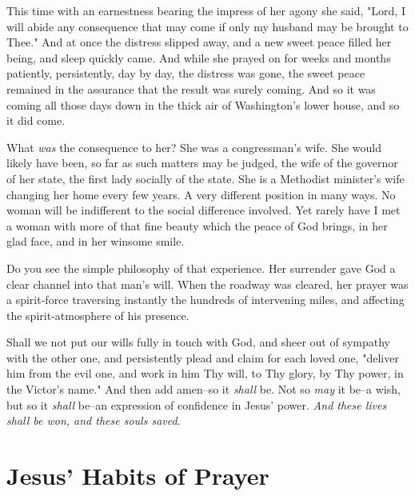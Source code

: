This time with an earnestness bearing the impress of her agony she said,
"Lord, I will abide any consequence that may come if only my husband may
be brought to Thee." And at once the distress slipped away, and a new
sweet peace filled her being, and sleep quickly came. And while she prayed
on for weeks and months patiently, persistently, day by day, the distress
was gone, the sweet peace remained in the assurance that the result was
surely coming. And so it was coming all those days down in the thick air
of Washington's lower house, and so it did come.

What \textit{was} the consequence to her? She was a congressman's wife. She would
likely have been, so far as such matters may be judged, the wife of the
governor of her state, the first lady socially of the state. She is a
Methodist minister's wife changing her home every few years. A very
different position in many ways. No woman will be indifferent to the
social difference involved. Yet rarely have I met a woman with more of
that fine beauty which the peace of God brings, in her glad face, and in
her winsome smile.

Do you see the simple philosophy of that experience. Her surrender gave
God a clear channel into that man's will. When the roadway was cleared,
her prayer was a spirit-force traversing instantly the hundreds of
intervening miles, and affecting the spirit-atmosphere of his presence.

Shall we not put our wills fully in touch with God, and sheer out of
sympathy with the other one, and persistently plead and claim for each
loved one, "deliver him from the evil one, and work in him Thy will, to
Thy glory, by Thy power, in the Victor's name." And then add amen--so it
\textit{shall} be. Not so \textit{may} it be--a wish, but so it \textit{shall} be--an
expression of confidence in Jesus' power. \textit{And these lives shall be won,
and these souls saved}.




\part{Jesus' Habits of Prayer}





